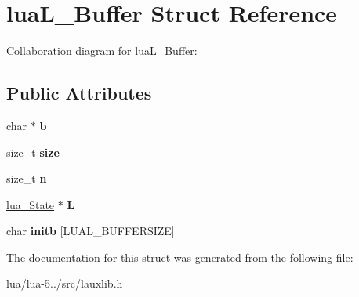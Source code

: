 \hypertarget{structlua_l___buffer}{\section{lua\+L\+\_\+\+Buffer Struct Reference}
\label{structlua_l___buffer}
}


Collaboration diagram for lua\+L\+\_\+\+Buffer\+:
\subsection*{Public Attributes}
\begin{DoxyCompactItemize}
\item 
\hypertarget{structlua_l___buffer_ad519a6ef1557666cbdef35e5e8a4ef3b}{char $\ast$ {\bfseries b}}\label{structlua_l___buffer_ad519a6ef1557666cbdef35e5e8a4ef3b}

\item 
\hypertarget{structlua_l___buffer_a2d0288dac89591516c834328beee71cf}{size\+\_\+t {\bfseries size}}\label{structlua_l___buffer_a2d0288dac89591516c834328beee71cf}

\item 
\hypertarget{structlua_l___buffer_a85c23e8716842c83ee8e9d80f1652812}{size\+\_\+t {\bfseries n}}\label{structlua_l___buffer_a85c23e8716842c83ee8e9d80f1652812}

\item 
\hypertarget{structlua_l___buffer_a66ae63716768952c74910da4351886fb}{\hyperlink{structlua___state}{lua\+\_\+\+State} $\ast$ {\bfseries L}}\label{structlua_l___buffer_a66ae63716768952c74910da4351886fb}

\item 
\hypertarget{structlua_l___buffer_a740a9839c94f115d3d5f574a066b9d49}{char {\bfseries initb} \mbox{[}L\+U\+A\+L\+\_\+\+B\+U\+F\+F\+E\+R\+S\+I\+Z\+E\mbox{]}}\label{structlua_l___buffer_a740a9839c94f115d3d5f574a066b9d49}

\end{DoxyCompactItemize}


The documentation for this struct was generated from the following file\+:\begin{DoxyCompactItemize}
\item 
lua/lua-\/5../src/lauxlib.\+h\end{DoxyCompactItemize}
